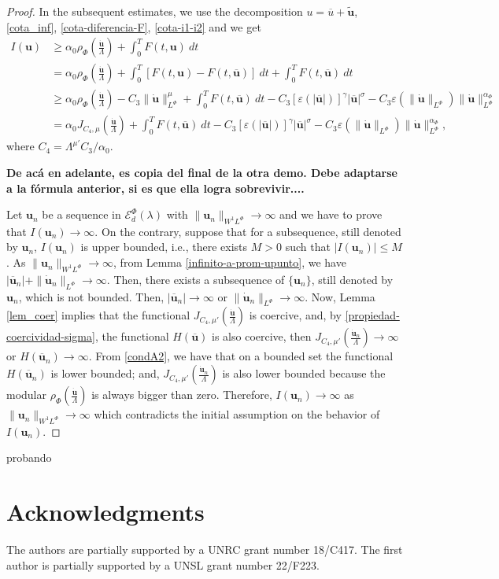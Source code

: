 \documentclass[twoside]{article}
\theoremstyle{remark}
\newcommand{\orlnor}{\|_{L^{\Phi}}}
\newcommand{\lphi}{L^{\Phi}}
\newcommand{\sobnor}{\|_{W^{1}\lphi}}
\newcommand{\domi}{\mathcal{E}^{\Phi}_d(\lambda)}
\renewcommand{\b}[1]{\boldsymbol{#1}}
\renewcommand{\leq}{\leqslant}
\renewcommand{\geq}{\geqslant}
\begin{document}
\begin{proof}
In the subsequent estimates, we use the decomposition $u=\overline{u}+\b{\tilde{u}}$, \eqref{cota_inf}, \eqref{cota-diferencia-F},
\eqref{cota-i1-i2} and we get
\begin{equation}\label{cota_inf_I}
\begin{split}
I(\b{u})&\geq\alpha_0\rho_{\Phi}\left( \frac{\b{\dot{u}}}{\Lambda}\right)+\int_0^TF(t,\b{u})\ dt
\\ 
&=\alpha_0\rho_{\Phi}\left( \frac{\b{\dot{u}}}{\Lambda}\right)+ \int_0^T \left[F(t,\b{u})-F(t,\b{\overline{u}})\right]\ dt 
+  \int_0^TF(t,\b{\overline{u}})\ dt
\\
&\geq \alpha_0\rho_{\Phi}\left( \frac{\b{\dot{u}}}{\Lambda}\right)
-C_3 \|\b{\dot u}\orlnor^{\mu}
+\int_0^TF(t,\b{\overline{u}})\ dt-
C_3 [\varepsilon(|\b{\overline{u}}|)]^{\gamma}|\b{\overline{u}}|^{\sigma}-C_3
\varepsilon(\|\b{\dot{u}}\orlnor)\|\b{\dot{u}}\orlnor^{\alpha_{\Phi}}
\\
&=\alpha_0J_{C_4,\mu}\left(\frac{\b{\dot u}}{\Lambda}\right)
+\int_0^TF(t,\b{\overline{u}})\ dt-
C_3 [\varepsilon(|\b{\overline{u}}|)]^{\gamma}|\b{\overline{u}}|^{\sigma}-C_3
\varepsilon(\|\b{\dot{u}}\orlnor)\|\b{\dot{u}}\orlnor^{\alpha_{\Phi}},
\end{split}
\end{equation}
where $C_4=\Lambda^{\mu'}C_3/\alpha_0$.

{\bf De ac\'a en adelante, es copia del  final de la otra demo. Debe adaptarse a la f\'ormula anterior, si es que ella logra sobrevivir....}  

Let $\b{u}_n$ be  a sequence in $\domi$ with 
$\|\b{u}_n\sobnor\to\infty$ and we have to prove that $I(\b{u}_n)\to\infty$. 
On the contrary, suppose  that for a subsequence, 
still denoted by $\b{u}_n$, $I(\b{u}_n)$ is upper bounded, i.e., there exists $M>0$ such that $|I(\b{u}_{n})|\leq M$. 
As $\|\b{u}_n\sobnor\to\infty$, from Lemma \ref{infinito-a-prom-upunto},  we have $|\overline{\b{u}}_n|+\|\b{\dot{u}}_n\orlnor\to \infty$.
Then, there exists a subsequence of $\{\b{u}_n\}$, still denoted by $\b{u}_n$, which is not bounded.
Then, 
$|\b{\overline u}_n|\to \infty$ or $\|\b{\dot{u}}_n\orlnor\to \infty$.
Now, Lemma \ref{lem_coer} implies that the functional $J_{C_4,\mu'}(\frac{\b{\dot u}}{\Lambda})$ is coercive,
and, by \eqref{propiedad-coercividad-sigma},
the functional $H(\b{\overline{u}})$ is also coercive, then 
$J_{C_4,\mu'}(\frac{\b{\dot u}_n}{\Lambda}) \to \infty$ or $H(\b{\overline{u}}_n)\to \infty$.
From \eqref{condA2}, we have that on a bounded set the functional $H(\b{\overline{u}}_n)$ is lower bounded; and, $J_{C_4,\mu'}(\frac{\b{\dot u}_n}{\Lambda})$ is also lower bounded  because the modular $\rho_{\Phi}\left(\frac{\b{\dot u}}{\Lambda}\right)$ is always bigger than zero. 
Therefore,  $I(\b{u}_n)\to\infty$ as $\|\b{u}_n\sobnor\to\infty$ which contradicts the initial assumption on the behavior of $I(\b{u}_n)$. 
\end{proof}
probando




\section*{Acknowledgments}
The authors are partially supported by a UNRC grant number 18/C417. The first author is  partially supported by a  UNSL grant number 22/F223. 


  
 
\end{document}
